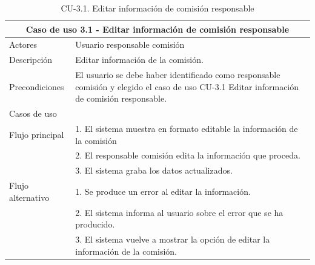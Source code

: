 \begin{table}[H]
    \caption{CU-3.1. Editar información de comisión responsable}
    \label{tab:CU-3.1}
    \begin{center}
        \begin{tabular}{|l|p{12cm}|}
            \hline
            \multicolumn{2}{|c|}{Caso de uso 3.1 - Editar información de comisión responsable} \\ \hline \hline
            Actores                 &   Usuario responsable comisión          \\  \hline
            Descripción             &   Editar información  de la comisión. \\  \hline
            Precondiciones          &   El usuario se debe haber identificado como responsable comisión y elegido el caso de uso CU-3.1 Editar información de comisión responsable. \\
            \hline
            Casos de uso            &             \\  \hline
            Flujo principal         &   1. El sistema muestra en formato editable la información de la comisión   \\
            &   2. El responsable comisión edita la información que proceda.    \\ 
            & 3. El sistema graba los datos actualizados. \\ 
            \hline
            Flujo alternativo    &   1. Se produce un error al editar la información. \\
            & 2. El sistema informa al usuario sobre el error que se ha producido. \\
            & 3. El sistema vuelve a mostrar la opción de editar la información de la comisión. \\ 
            \hline
        \end{tabular}
    \end{center}
\end{table}


